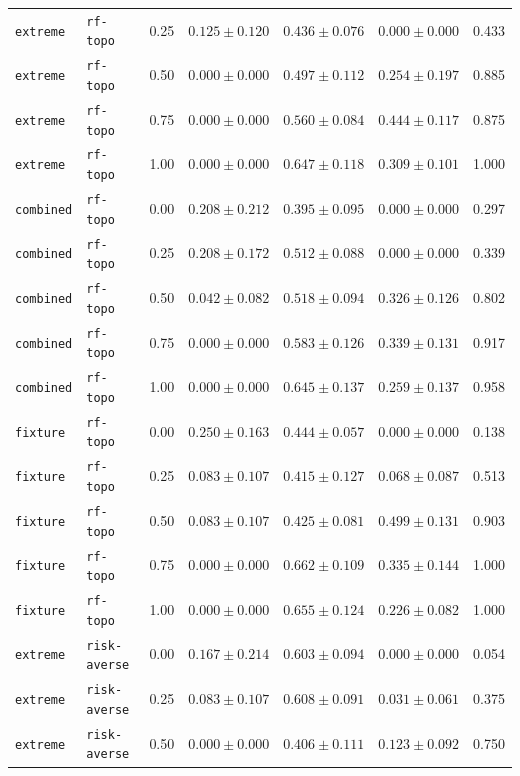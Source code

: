 \documentclass{article}
\begin{document}
\begin{center}
\begin{tabular}{lllcccc}
\texttt{extreme} & \texttt{rf-topo} & 0.25 & $0.125 \pm 0.120$ & $0.436 \pm 0.076$ & $0.000 \pm 0.000$ & 0.433 \\
\texttt{extreme} & \texttt{rf-topo} & 0.50 & $0.000 \pm 0.000$ & $0.497 \pm 0.112$ & $0.254 \pm 0.197$ & 0.885 \\
\texttt{extreme} & \texttt{rf-topo} & 0.75 & $0.000 \pm 0.000$ & $0.560 \pm 0.084$ & $0.444 \pm 0.117$ & 0.875 \\
\texttt{extreme} & \texttt{rf-topo} & 1.00 & $0.000 \pm 0.000$ & $0.647 \pm 0.118$ & $0.309 \pm 0.101$ & 1.000 \\
\texttt{combined} & \texttt{rf-topo} & 0.00 & $0.208 \pm 0.212$ & $0.395 \pm 0.095$ & $0.000 \pm 0.000$ & 0.297 \\
\texttt{combined} & \texttt{rf-topo} & 0.25 & $0.208 \pm 0.172$ & $0.512 \pm 0.088$ & $0.000 \pm 0.000$ & 0.339 \\
\texttt{combined} & \texttt{rf-topo} & 0.50 & $0.042 \pm 0.082$ & $0.518 \pm 0.094$ & $0.326 \pm 0.126$ & 0.802 \\
\texttt{combined} & \texttt{rf-topo} & 0.75 & $0.000 \pm 0.000$ & $0.583 \pm 0.126$ & $0.339 \pm 0.131$ & 0.917 \\
\texttt{combined} & \texttt{rf-topo} & 1.00 & $0.000 \pm 0.000$ & $0.645 \pm 0.137$ & $0.259 \pm 0.137$ & 0.958 \\
\texttt{fixture} & \texttt{rf-topo} & 0.00 & $0.250 \pm 0.163$ & $0.444 \pm 0.057$ & $0.000 \pm 0.000$ & 0.138 \\
\texttt{fixture} & \texttt{rf-topo} & 0.25 & $0.083 \pm 0.107$ & $0.415 \pm 0.127$ & $0.068 \pm 0.087$ & 0.513 \\
\texttt{fixture} & \texttt{rf-topo} & 0.50 & $0.083 \pm 0.107$ & $0.425 \pm 0.081$ & $0.499 \pm 0.131$ & 0.903 \\
\texttt{fixture} & \texttt{rf-topo} & 0.75 & $0.000 \pm 0.000$ & $0.662 \pm 0.109$ & $0.335 \pm 0.144$ & 1.000 \\
\texttt{fixture} & \texttt{rf-topo} & 1.00 & $0.000 \pm 0.000$ & $0.655 \pm 0.124$ & $0.226 \pm 0.082$ & 1.000 \\
\texttt{extreme} & \texttt{risk-averse} & 0.00 & $0.167 \pm 0.214$ & $0.603 \pm 0.094$ & $0.000 \pm 0.000$ & 0.054 \\
\texttt{extreme} & \texttt{risk-averse} & 0.25 & $0.083 \pm 0.107$ & $0.608 \pm 0.091$ & $0.031 \pm 0.061$ & 0.375 \\
\texttt{extreme} & \texttt{risk-averse} & 0.50 & $0.000 \pm 0.000$ & $0.406 \pm 0.111$ & $0.123 \pm 0.092$ & 0.750 \\

\end{tabular}
\end{center}
\end{document}
